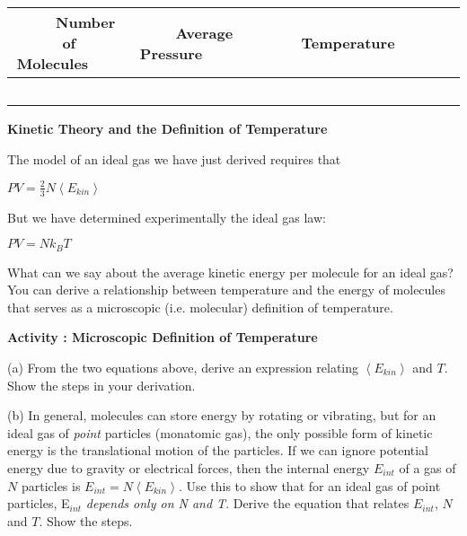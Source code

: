 \vspace{0.3cm}
{\centering \begin{tabular}{|c|c|c|}
\hline 
~~~~Number of Molecules~~~~&
~~~~Average Pressure~~~~&
~~~~~~Temperature~~~~~~~\\
\hline
\hline 
& &
\\
\hline 
& &
\\
\hline 
& &
\\
\hline 
& &
\\
\hline 
& &
\\
\hline
\end{tabular}\par}
\vspace{0.3cm}

\textbf{Kinetic Theory and the Definition of Temperature}

The model of an ideal gas we have just derived requires that

{\centering \( PV=\frac{2}{3}N\left\langle E_{kin}\right\rangle  \)\par}

But we have determined experimentally the ideal gas law:

{\centering \( PV = Nk_{B}T \)\par}

What can we say about the average kinetic energy per molecule for
an ideal gas? You can derive a relationship between temperature and
the energy of molecules that serves as a microscopic (i.e. molecular)
definition of temperature.

\textbf{Activity : Microscopic Definition of Temperature}

(a) From the two equations above, derive an expression relating \( \left\langle E_{kin}\right\rangle  \)
and \( T \). Show the steps in your derivation.
\vspace{1.5in}

\newpage

(b) In general, molecules can store energy by rotating or vibrating,
but for an ideal gas of \emph{point} particles (monatomic gas), 
the only possible form of kinetic energy is the translational motion of the particles. 
If we can ignore potential energy due to gravity or electrical forces, then the internal
energy \( E_{int} \) of a gas of \( N \) particles is \( E_{int}=N\left\langle E_{kin}\right\rangle  \).
Use this to show that for an ideal gas of point particles, E\( _{int} \)
\emph{depends only on N and T}. Derive the equation that relates \( E_{int} \),
\( N \) and \( T \). Show the steps.
\vspace{1.5in}

